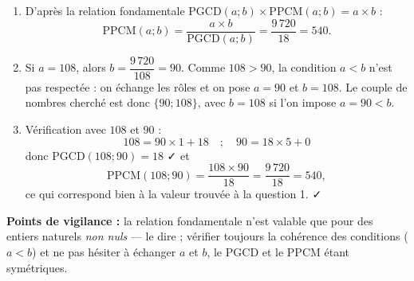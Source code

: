\documentclass[11pt]{article}
\begin{document}
\begin{corrige}
\begin{enumerate}
    \item D'après la relation fondamentale $\text{PGCD}(a ; b) \times \text{PPCM}(a ; b) = a \times b$ :
    \[ \text{PPCM}(a ; b) = \dfrac{a \times b}{\text{PGCD}(a ; b)} = \dfrac{9\,720}{18} = 540. \]
    \item Si $a = 108$, alors $b = \dfrac{9\,720}{108} = 90$. Comme $108 > 90$, la condition $a < b$ n'est pas respectée : on échange les rôles et on pose $a = 90$ et $b = 108$. Le couple de nombres cherché est donc $\{90 ; 108\}$, avec $b = 108$ si l'on impose $a = 90 < b$.
    \item Vérification avec $108$ et $90$ :
    \[ 108 = 90 \times 1 + 18 \quad ; \quad 90 = 18 \times 5 + 0 \]
    donc $\text{PGCD}(108 ; 90) = 18$ ✓ et
    \[ \text{PPCM}(108 ; 90) = \dfrac{108 \times 90}{18} = \dfrac{9\,720}{18} = 540, \]
    ce qui correspond bien à la valeur trouvée à la question 1. ✓
\end{enumerate}
\textbf{Points de vigilance :} la relation fondamentale n'est valable que pour des entiers naturels \emph{non nuls} — le dire ; vérifier toujours la cohérence des conditions ($a < b$) et ne pas hésiter à échanger $a$ et $b$, le PGCD et le PPCM étant symétriques.
\end{corrige}
\end{document}
